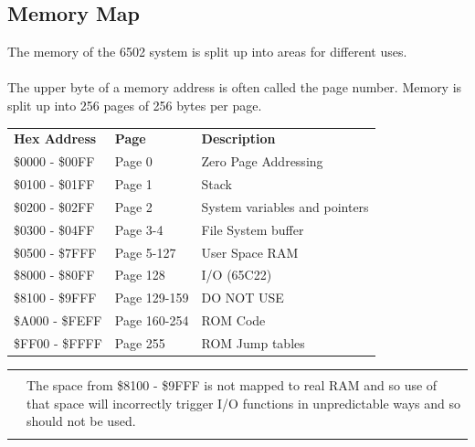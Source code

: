 \documentclass{ol-softwaremanual}
\newcommand{\Note}[1]{
\begin{table}[h]
\begin{tabular}{|p{0.1\textwidth}p{0.8\textwidth}|}
\hline
 & \\
\multicolumn{1}{|r}{\Huge\warning} & #1\\
 &  \\ \hline
\end{tabular}
\end{table}
}
\begin{document}
\subsection{Memory Map}
The memory of the 6502 system is split up into areas for different uses.\\
\\
The upper byte of a memory address is often called the page number. Memory is split up into 256 pages of 256 bytes per page.\\
\begin{table}[H]
\centering
\begin{tabular}{|l|l|l|}
\cline{1-3}
\textbf{Hex Address} & \textbf{Page} & \textbf{Description}  \\ \cline{1-3}
\$0000 - \$00FF & Page 0 & Zero Page Addressing\\ \cline{1-3}
\$0100 - \$01FF & Page 1 & Stack\\ \cline{1-3}
\$0200 - \$02FF & Page 2 & System variables and pointers\\ \cline{1-3}
\$0300 - \$04FF & Page 3-4 & File System buffer\\ \cline{1-3}
\$0500 - \$7FFF & Page 5-127 & User Space RAM\\ \cline{1-3}
\$8000 - \$80FF & Page 128 & I/O (65C22)\\ \cline{1-3}
\$8100 - \$9FFF & Page 129-159 & DO NOT USE\\ \cline{1-3}
\$A000 - \$FEFF & Page 160-254 & ROM Code\\ \cline{1-3}
\$FF00 - \$FFFF & Page 255 & ROM Jump tables\\ \cline{1-3}
\end{tabular}
\end{table}

\Note{The space from \$8100 - \$9FFF is not mapped to real RAM and so use of that space will incorrectly trigger I/O functions in unpredictable ways and so should not be used.}
\end{document}
